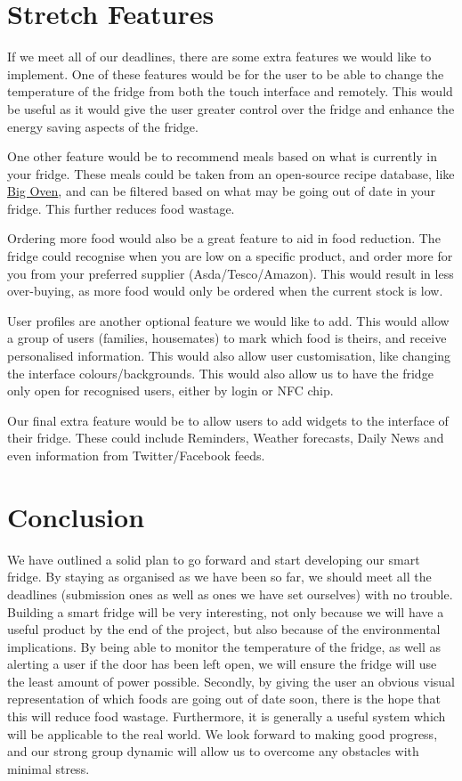 \documentclass[10pt]{article}
\begin{document}
\section{Stretch Features}
If we meet all of our deadlines, there are some extra features we would like to implement. One of these features would be for the user to be able to change the temperature of the fridge from both the touch interface and remotely. This would be useful as it would give the user greater control over the fridge and enhance the energy saving aspects of the fridge.

One other feature would be to recommend meals based on what is currently in your fridge. These meals could be taken from an open-source recipe database, like \hyperref[http://api.bigoven.com]{Big Oven}, and can be filtered based on what may be going out of date in your fridge. This further reduces food wastage.

Ordering more food would also be a great feature to aid in food reduction. The fridge could recognise when you are low on a specific product, and order more for you from your preferred supplier (Asda/Tesco/Amazon). This would result in less over-buying, as more food would only be ordered when the current stock is low.

User profiles are another optional feature we would like to add. This would allow a group of users (families, housemates) to mark which food is theirs, and receive personalised information. This would also allow user customisation, like changing the interface colours/backgrounds. This would also allow us to have the fridge only open for recognised users, either by login or NFC chip.

Our final extra feature would be to allow users to add widgets to the interface of their fridge. These could include Reminders, Weather forecasts, Daily News and even information from Twitter/Facebook feeds. 

\section{Conclusion}

We have outlined a solid plan to go forward and start developing our smart fridge. By staying as organised as we have been so far, we should meet all the deadlines (submission ones as well as ones we have set ourselves) with no trouble. Building a smart fridge will be very interesting, not only because we will have a useful product by the end of the project, but also because of the environmental implications. By being able to monitor the temperature of the fridge, as well as alerting a user if the door has been left open, we will ensure the fridge will use the least amount of power possible. Secondly, by giving the user an obvious visual representation of which foods are going out of date soon, there is the hope that this will reduce food wastage. Furthermore, it is generally a useful system which will be applicable to the real world. We look forward to making good progress, and our strong group dynamic will allow us to overcome any obstacles with minimal stress.
\end{document}
